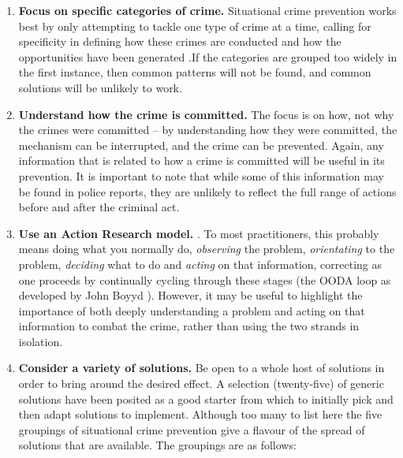 \begin{enumerate}

\item{\bf{Focus on specific categories of crime.}} Situational crime prevention works best by only attempting to tackle one type of crime at a time, calling for specificity in defining how these crimes are conducted and how the opportunities have been generated \parencite{felson1998opportunity}.If the categories are grouped too widely in the first instance, then common patterns will not be found, and common solutions will be unlikely to work.

\item{\bf{Understand how the crime is committed.}} The focus is on how, not why the crimes were committed – by understanding how they were committed, the mechanism can be interrupted, and the crime can be prevented. Again, any information that is related to how a crime is committed will be useful in its prevention. It is important to note that while some of this information may be found in police reports, they are unlikely to reflect the full range of actions before and after the criminal act.

\item{\bf{Use an Action Research model.}}  \parencite{avison1999action}. To most practitioners, this probably means doing what you normally do, \emph{observing} the problem, \emph{orientating} to the problem, \emph{deciding} what to do and \emph{acting} on that information, correcting as one proceeds by continually cycling through these stages (the OODA loop as developed by John Boyyd \parencite{modernstrat}). However, it may be useful to highlight the importance of both deeply understanding a problem and acting on that information to combat the crime, rather than using the two strands in isolation.

\item{\bf{Consider a variety of solutions.}} Be open to a whole host of solutions in order to bring around the desired effect. A selection (twenty-five) of generic solutions have been posited as a good starter from which to initially pick and then adapt solutions to implement. Although too many to list here the five groupings of situational crime prevention give a flavour of the spread of solutions that are available. The groupings are as follows:


\end{enumerate}
